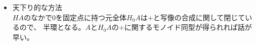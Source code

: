 \begin{itemize}
\begin{itemize}
\begin{equation}
\begin{split}
{					0^* & 0^* & 0^* & 0^* \\
					1_M & 0^* & 1_M & f_2 \\
					f_2 & 0^* & f_2 & 1_M + ? \\
				} \\
			\end{split}\end{equation} %
			$f_2+1_M$と$f_2f_2=f_2+f_2$のところが未定である。
			こうやって、群表を埋めていった結果と$A$がモノイド同型になることを示せればよい。
			この方法で、$A$が可算集合の場合には構成的に乗法が定義できるように思える。
			\item 天下り的な方法 \\
			$HA$のなかで$0$を固定点に持つ元全体$H_0A$は$+$と写像の合成に関して閉じているので、
			半環となる。$A$と$H_0A$の$+$に関するモノイド同型が得られれば話が早い。
		\end{itemize}
	\end{itemize}
